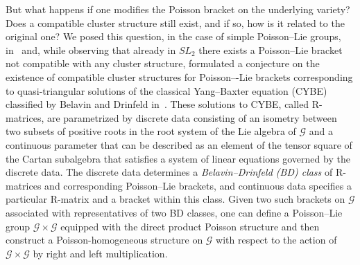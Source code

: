 \documentclass{amsart}
\theoremstyle{definition}
\theoremstyle{remark}
\numberwithin{equation}{section}
\numberwithin{theorem}{section}
\def\G{{\mathcal G}}
\begin{document}
 But what happens if one modifies the Poisson bracket on the underlying variety? Does a compatible cluster structure still exist, and if so, how is it related to the original one? We posed this question, in the case of simple Poisson--Lie groups, in~\cite{GSVM} and, while observing that already in $SL_2$ there exists a Poisson--Lie bracket not compatible with any cluster structure, formulated a conjecture on the existence of compatible cluster structures for Poisson–-Lie brackets corresponding to quasi-triangular solutions of  the classical Yang--Baxter equation  (CYBE) classified by Belavin and Drinfeld in~\cite{BD}.  These solutions to CYBE, called  R-matrices, are  parametrized by discrete data consisting of an isometry between two subsets of positive roots in the root system of the Lie algebra of $\G$ and a continuous parameter that can be described as an element of the tensor square of the Cartan subalgebra that satisfies a system of linear equations governed by the discrete data. The discrete data determines a {\em Belavin--Drinfeld (BD) class\/} of R-matrices and corresponding Poisson--Lie brackets, and continuous data specifies 
a particular R-matrix and a bracket within this class. Given two such brackets on $\G$ associated with representatives of two BD classes, one can define a Poisson--Lie group 
$\G\times \G$ equipped with the direct product Poisson structure and then construct a Poisson-homogeneous structure on $\G$ with respect to the action of  $\G\times \G$ by right and left multiplication. 
\end{document}
